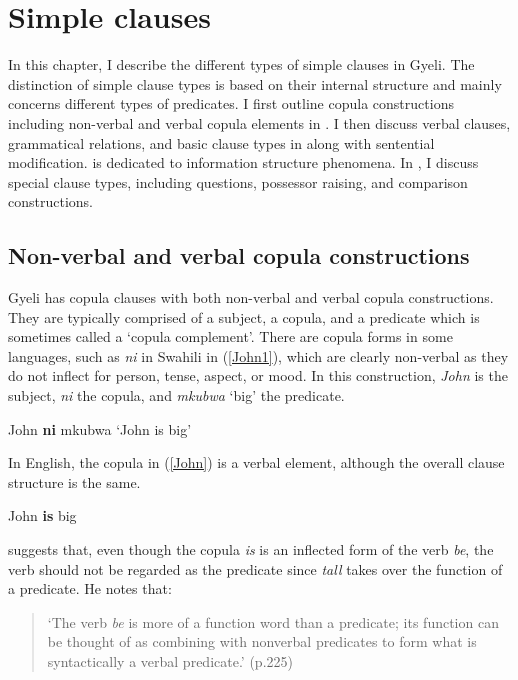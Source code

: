 \chapter{Simple clauses}
\label{sec:SC}


In this chapter, I describe the different types of simple clauses in Gyeli. The distinction of simple clause types is based on their internal structure and mainly concerns different types of predicates.  I first outline copula constructions including non-verbal and verbal copula elements in . I then discuss verbal clauses, grammatical relations, and basic clause types in  along with sentential modification.  is dedicated to information structure phenomena.  In , I discuss special clause types, including questions, possessor raising, and comparison constructions.





\section[Copula constructions]{Non-verbal and verbal copula constructions}
\label{sec:nonverbalC}

Gyeli has copula clauses with both non-verbal and verbal copula constructions. They are typically comprised of a subject, a copula, and a predicate which is sometimes called a `copula complement'.  There are copula forms in some languages, such as {\itshape ni} in Swahili in (\ref{John1}), which are clearly non-verbal as they do not inflect for person, tense, aspect, or mood. In this construction, {\itshape John} is the subject, {\itshape ni} the copula, and {\itshape mkubwa} `big' the predicate.

\begin{exe}
\ex\label{John1} John {\bfseries ni} mkubwa `John is big'
\end{exe}

In English, the copula in (\ref{John}) is a verbal element, although the overall clause structure is the same.

\begin{exe}
\ex\label{John} John {\bfseries is} big
\end{exe}

\noindent \citet[225]{dryer2007a} suggests that, even though the copula {\itshape is} is an inflected form of the verb {\itshape be}, the verb should not be regarded as the predicate since {\itshape tall} takes over the function of a predicate. He notes that: 
\begin{quote} `The verb {\itshape be} is more of a function word than a predicate; its function can be thought of as combining with nonverbal predicates to form what is syntactically a verbal predicate.' (p.225)
\end{quote}

